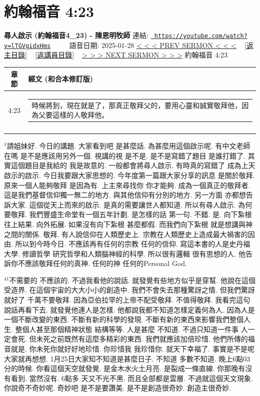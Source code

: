 \documentclass{book}
\begin{document}
\section{約翰福音 4:23}
\label{sec:lTGVgidxHms}
\textbf{尋人啟示 (約翰福音4\_23) - 陳恩明牧師}
\newline
\newline
連結: \href{https://youtube.com/watch?v=lTGVgidxHms}{\texttt{ https://youtube.com/watch?v=lTGVgidxHms}} ~~~~ 語音日期: 2025-01-28 
\newline
\newline
\hyperref[sec:4994BMikpLI]{< < < PREV SERMON < < <}
~
\hyperlink{toc}{[返主目錄]}
~
\hyperref[ch:preacher13]{[返講員目錄]}
~
\hyperref[sec:2sEF8L92TnY]{> > > NEXT SERMON > > >}
\newline
\newline
約翰福音 4:23
\newline
\begin{longtable}{cl}
\hline
\hline
章節 & 經文 (和合本修訂版)\\
\hline
4:23 & \begin{tabularx}{0.7\textwidth}{X} 時候將到，現在就是了，那真正敬拜父的，要用心靈和誠實敬拜他，因為父要這樣的人敬拜他。 \end{tabularx} \\ \\
[1ex]
\hline
\hline
\end{longtable}
$^{1}$請姐妹好.
今日的講題.
大家看到吧 是甚麼話.
為甚麼用這個啟示呢.
有中文老師在嗎 是不是應該用另外一個.
視講的視 是不是.
是不是寫錯了題目 是誰打錯了.
其實這個題目是我給的 我是故意的.
一般都會將尋人啟示.
有時真的寫錯了 成為上天啟示的啟示.
今日我要跟大家思想的.
今年度第一篇跟大家分享的訊息 是關於敬拜.
原來一個人能夠敬拜 是因為有.
上主來尋找你 你才能夠.
成為一個真正的敬拜者.
這是我們基督信仰獨一無二的地方.
與其他信仰有分別的地方.
另一方面 亦都想告訴大家.
這個從天上而來的啟示.
是真的需要讓世人都知道.
所以有尋人啟示.
為何要敬拜.
我們豐盛生命堂有一個五年計劃.
是怎樣的話 第一句.
不錯.
是.
向下紮根 往上結果.
向外拓展.
如果沒有向下紮根 甚麼都假.
而我們向下紮根 就是想講與神之間的關係.
敬拜.
有人說信仰在人類歷史上.
宗教在人類歷史上造成最大禍害的因由.
所以到今時今日.
不應該再有任何的宗教 任何的信仰.
寫這本書的人是史丹福大學.
修讀哲學 研究哲學和人類腦神經的科學.
所以很有邏輯 很有思想的人.
他告訴你不應該敬拜任何的真神.
任何的神 任何的Personal God.

$^{41}$不需要的 不應該的.
不過我看他的說話.
就發覺有些地方似乎是穿幫.
他說在這個受造界.
在這個宇宙的大大小小的創造中.
我們不會失去那種驚訝之情.
但我們驚訝就好了 千萬不要敬拜.
因為亞伯拉罕的上帝不配受敬拜.
不值得敬拜.
我看完這句說話再看下去.
就發覺他連人是怎樣.
他都說我都不知道怎樣定義何為人.
因為人是一個不斷改變的東西.
不斷有新的科學的發現.
不斷有新的東西來影響我們整個人生.
整個人甚至那個精神狀態 結構等等.
人是甚麼 不知道.
不過只知道一件事 人一定會死.
但未死之前既然有這麼多精彩的東西.
我們就應該加倍珍惜.
他們所傳的福音就是.
你未死你就好好地珍惜.
你珍惜我 我珍惜你.
就天下幸福了.
事實是不是呢 大家就再想想.
1月25日大家知不知道是甚麼日子.
不知道 多數不知道.
晚上6點03分的時候.
你看這個天空就發覺.
是金木水火土月亮.
是裂成一條直線.
你那晚有沒有看到.
當然沒有.
6點多 天又不光不黑.
而且全部都是雲層.
不過就這個天文現象.
你說奇不奇妙呢.
奇妙吧 是不是要讚美.
是不是創造很奇妙.
創造主很奇妙.
\end{document}
